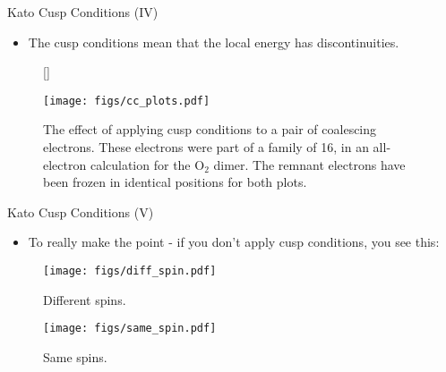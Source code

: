 \documentclass[12pt, pdf, hyperref={draft}, usenames, dvipsnames,
aspectratio=169]{beamer}
\begin{document}
\begin{frame}{Kato Cusp Conditions (IV)}

\begin{itemize}
  \item The cusp conditions mean that the local energy has discontinuities.
\end{itemize}

\begin{figure}[H]
  [\FBwidth]
  {\caption{The effect of applying cusp conditions to a pair of coalescing
  electrons. These electrons were part of a family of 16, in an all-electron
  calculation for the O$_2$ dimer. The remnant electrons have been frozen in
  identical positions for both plots.}\label{fig:cusps}}
  {\texttt{[image: figs/cc\_plots.pdf]}}
\end{figure}
\end{frame}


\begin{frame}{Kato Cusp Conditions (V)}

\begin{itemize}
  \item To really make the point - if you don't apply cusp conditions, you see this:
\end{itemize}
\begin{minipage}[t]{0.45\textwidth}
\begin{figure}[H]
  \centering
  \texttt{[image: figs/diff\_spin.pdf]}
  \caption{Different spins.}
\label{fig:diff_spin}
\end{figure}
\end{minipage}%
\hfill
\begin{minipage}[t]{0.45\textwidth}
\begin{figure}[H]
  \centering
  \texttt{[image: figs/same\_spin.pdf]}
  \caption{Same spins.}
\label{fig:same_spin}
\end{figure}
\end{minipage}%
\end{frame}
\end{document}
